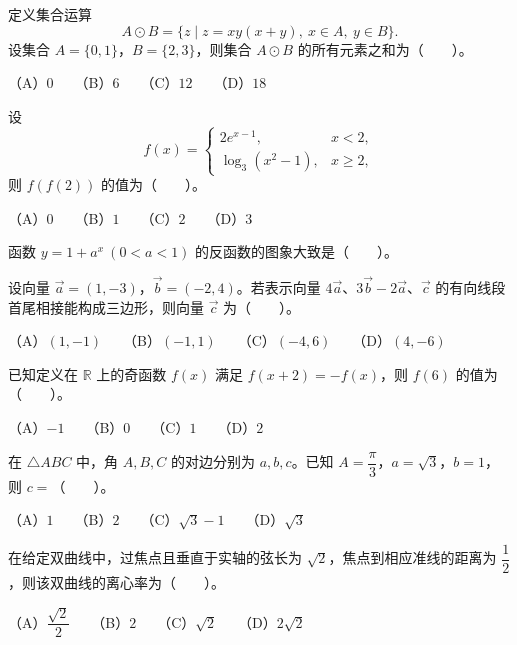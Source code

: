 \begin{question}
定义集合运算
\nopagebreak[4]
\[
A\odot B=\{z\mid z=xy(x+y),\ x\in A,\ y\in B\}.
\]
设集合 $A=\{0,1\}$，$B=\{2,3\}$，则集合 $A\odot B$ 的所有元素之和为\mbox{（　　）}。

（A）$0$　　（B）$6$　　（C）$12$　　（D）$18$

\end{question}
\begin{question}
设
\nopagebreak[4]
\[
f(x)=\begin{cases}
2e^{x-1}, & x<2,\\
\log_3(x^2-1), & x\ge 2,
\end{cases}
\]
则 $f(f(2))$ 的值为\mbox{（　　）}。

（A）$0$　　（B）$1$　　（C）$2$　　（D）$3$

\Needspace{0.4\textheight}
\end{question}
\begin{question}
函数 $y=1+a^x\ (0<a<1)$ 的反函数的图象大致是\mbox{（　　）}。
\nopagebreak[4]
\begin{center}\end{center}
\nopagebreak[4]
\end{question}
\begin{question}
设向量 $\vec a=(1,-3)$，$\vec b=(-2,4)$。若表示向量 $4\vec a$、$3\vec b-2\vec a$、$\vec c$ 的有向线段首尾相接能构成三边形，则向量 $\vec c$ 为\mbox{（　　）}。

（A）$(1,-1)$　　（B）$(-1,1)$　　（C）$(-4,6)$　　（D）$(4,-6)$

\end{question}
\begin{question}
已知定义在 $\mathbb R$ 上的奇函数 $f(x)$ 满足 $f(x+2)=-f(x)$，则 $f(6)$ 的值为\mbox{（　　）}。

（A）$-1$　　（B）$0$　　（C）$1$　　（D）$2$

\end{question}
\begin{question}
在 $\triangle ABC$ 中，角 $A,B,C$ 的对边分别为 $a,b,c$。已知 $A=\dfrac{\pi}{3}$，$a=\sqrt3$，$b=1$，则 $c=$\mbox{（　　）}。

（A）$1$　　（B）$2$　　（C）$\sqrt3-1$　　（D）$\sqrt3$

\end{question}
\begin{question}
在给定双曲线中，过焦点且垂直于实轴的弦长为 $\sqrt2$，焦点到相应准线的距离为 $\dfrac12$，则该双曲线的离心率为\mbox{（　　）}。

（A）$\dfrac{\sqrt2}{2}$　　（B）$2$　　（C）$\sqrt2$　　（D）$2\sqrt2$

\end{question}
